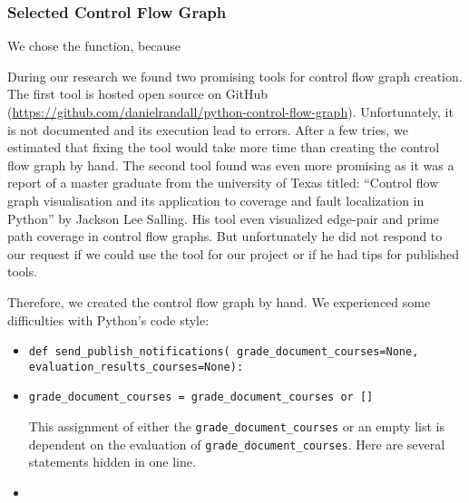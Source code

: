 \usetikzlibrary{arrows,automata}

\subsubsection{Selected Control Flow Graph}
We chose the function, because %

During our research we found two promising tools for control flow graph creation. 
The first tool is hosted open source on GitHub (\url{https://github.com/danielrandall/python-control-flow-graph}). 
Unfortunately, it is not documented and its execution lead to errors. 
After a few tries, we estimated that fixing the tool would take more time than creating the control flow graph by hand.
The second tool found was even more promising as it was a report of a master graduate from the university of Texas titled: 
``Control flow graph visualisation and its application to coverage and fault localization in Python''
by Jackson Lee Salling.
His tool even visualized edge-pair and prime path coverage in control flow graphs.
But unfortunately he did not respond to our request if we could use the tool for our project or if he had tips for published tools.


Therefore, we created the control flow graph by hand. We experienced some difficulties with Python's code style:
\begin{itemize}
    \item \texttt{def send\_publish\_notifications(
        grade\_document\_courses=None, 
        evaluation\_results\_courses=None):}
    
    
    \item \texttt{grade\_document\_courses = grade\_document\_courses or []}
    
    This assignment of either the \texttt{grade\_document\_courses} or an empty list is dependent on the evaluation of \texttt{grade\_document\_courses}. Here are several statements hidden in one line.
    \item 
\end{itemize}




